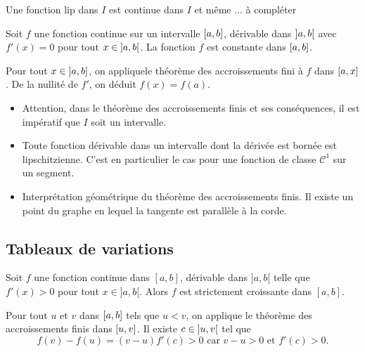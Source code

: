 Une fonction lip dans $I$ est continue dans $I$ et même ... à compléter 
\begin{prop}
 Soit $f$ une fonction continue sur un intervalle $\left[ a , b \right]$, dérivable dans $\left] a , b \right[$ avec $f'(x) = 0 $ pour tout $x\in \left] a , b \right[$. La fonction $f$ est constante dans $\left[ a , b \right]$.
\end{prop}
\begin{demo}
 Pour tout $x \in \left] a , b \right]$, on appliquele théorème des accroissements fini à $f$ dans $\left[ a , x \right]$. De la nullité de $f'$, on déduit $f(x) = f(a)$.
\end{demo}
\begin{rems}
\begin{itemize}
 \item Attention, dans le théorème des accroissements finis et ses conséquences, il est impératif que $I$ soit un intervalle. 
 \item  Toute fonction dérivable dans un intervalle dont la dérivée est bornée est lipschitzienne. C'est en particulier le cas pour une fonction de classe $\mathcal C^1$ sur un segment.
\item Interprétation géométrique du théorème des accroissements finis. Il existe un point du graphe en lequel la tangente est parallèle à la corde.
\end{itemize}
\end{rems}


\subsection{Tableaux de variations}
\begin{prop}
 Soit $f$ une fonction continue dans $[a,b]$, dérivable dans $]a,b[$ telle que $f'(x)>0$ pour tout $x\in]a,b[$. Alors $f$ est strictement croissante dans $[a,b]$.
\end{prop}
\begin{demo}
 Pour tout $u$ et $v$ dans $\left[ a , b \right]$ tels que $u<v$, on applique le théorème des accroissements finis dans $\left[ u , v \right]$. Il existe $c \in \left] u , v \right[$ tel que 
 \[
  f(v) - f(u) = (v-u)f'(c) >0 \text{ car } v-u > 0 \text{ et } f'(c) > 0.
 \]
\end{demo}


